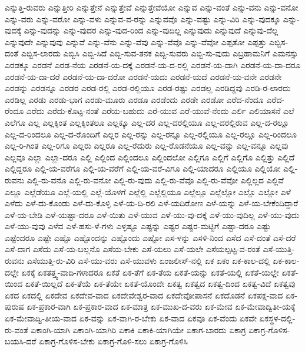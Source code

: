 {ಎನ್ನುತ್ತಿ-ರುವರು
ಎನ್ನುತ್ತೀರಿ
ಎನ್ನುತ್ತೇನೆ
ಎನ್ನುತ್ತೇವೆ
ಎನ್ನುತ್ತೇವೆಯೋ
ಎನ್ನುವ
ಎನ್ನು-ವಂತೆ
ಎನ್ನು-ವನು
ಎನ್ನು-ವನೋ
ಎನ್ನು-ವರು
ಎನ್ನು-ವರೋ
ಎನ್ನು-ವಳು
ಎನ್ನುವ-ವ-ರನ್ನು
ಎನ್ನುವವೊ
ಎನ್ನು-ವಷ್ಟು
ಎನ್ನು-ವಿರಿ
ಎನ್ನು-ವುದಕ್ಕೂ
ಎನ್ನು-ವುದಕ್ಕೆ
ಎನ್ನು-ವುದನ್ನು
ಎನ್ನು-ವುದರ
ಎನ್ನು-ವುದ-ರಿಂದ
ಎನ್ನು-ವುದಿಲ್ಲ
ಎನ್ನುವುದು
ಎನ್ನುವುದೆ
ಎನ್ನುವು-ದೆಲ್ಲ
ಎನ್ನುವುದೇ
ಎನ್ನುವುವು
ಎನ್ನುವೆ
ಎನ್ನು-ವೆನು
ಎನ್ನು-ವೆವು
ಎನ್ನು-ವೆವೊ
ಎನ್ನು-ವೆವೋ
ಎಪ್ಪತೋ
ಎಪ್ಪತ್ತು
ಎಬ್ಬಿಸ-ದಂತೆ
ಎಬ್ಬಿಸ-ಲಾರದು
ಎಬ್ಬಿಸಿ
ಎಬ್ಬಿ-ಸಿದೆ
ಎಬ್ಬಿ-ಸುವ-ತನಕ
ಎಬ್ಬಿ-ಸುವರು
ಎಬ್ಬಿ-ಸು-ವುದು
ಎಬ್ರಹಾಮನಿಗೆ
ಎಮನಸ್ಸು
ಎರಡಕ್ಕೂ
ಎರಡನೆ
ಎರಡ-ನೆಯ
ಎರಡನೆ-ಯ-ದಕ್ಕೆ
ಎರಡನೆ-ಯ-ದ-ರಲ್ಲಿ
ಎರಡನೆ-ಯ-ದಾಗಿ
ಎರಡನೆ-ಯ-ದಾ-ದರೂ
ಎರಡನೆ-ಯ-ದಾ-ದರೆ
ಎರಡನೆ-ಯ-ದಾ-ದರೋ
ಎರಡನೆ-ಯದು
ಎರಡನೆ-ಯದೆ
ಎರಡನೆ-ಯ-ವನೇ
ಎರಡನೇ
ಎರಡನ್ನು
ಎರಡನ್ನೂ
ಎರಡರ
ಎರಡ-ರಲ್ಲಿ
ಎರಡ-ರಲ್ಲಿಯೂ
ಎರಡ-ರಷ್ಟು
ಎರಡಲ್ಲ
ಎರಡಿದ್ದವು
ಎರಡಿ-ರ-ಲಾರದು
ಎರಡಿಲ್ಲ
ಎರಡು
ಎರಡು-ಭಾಗ
ಎರಡು-ಮೂರು
ಎರಡೂ
ಎರಡೆಂದು
ಎರಡೇ
ಎರಡೋ
ಎರೆದ-ನೆಂದೂ
ಎರೆದ-ರೆಂದೂ
ಎರೆದು
ಎರೆದು-ಕೊಟ್ಟ-ನಂತೆ
ಎರೆಯ-ಬಹುದು
ಎರೆ-ಯುವ
ಎರೆ-ಯುವೆ-ನೆಂದು
ಎರ್ಲಿ
ಎಲಿಯಾಸನೆ
ಎಲೆ
ಎಲೆಗೂ
ಎಲ್ಲ
ಎಲ್ಲಕ್ಕಿಂತ
ಎಲ್ಲಕ್ಕಿಂತಲೂ
ಎಲ್ಲಕ್ಕೂ
ಎಲ್ಲ-ದರ
ಎಲ್ಲ-ದರಲ್ಲಿಯೂ
ಎಲ್ಲ-ದರಲ್ಲಿರುವ
ಎಲ್ಲ-ದ-ರಲ್ಲೂ
ಎಲ್ಲ-ದ-ರಿಂದಲೂ
ಎಲ್ಲ-ದ-ರೊಂದಿಗೆ
ಎಲ್ಲರ
ಎಲ್ಲ-ರನ್ನು
ಎಲ್ಲ-ರನ್ನೂ
ಎಲ್ಲ-ರಲ್ಲಿಯೂ
ಎಲ್ಲ-ರಲ್ಲೂ
ಎಲ್ಲ-ರಿಂದಲೂ
ಎಲ್ಲ-ರಿ-ಗಿಂತ
ಎಲ್ಲ-ರಿಗೂ
ಎಲ್ಲರು
ಎಲ್ಲರೂ
ಎಲ್ಲ-ರೆದುರು
ಎಲ್ಲ-ರೊಡನೆಯೂ
ಎಲ್ಲ-ವನ್ನು
ಎಲ್ಲ-ವನ್ನೂ
ಎಲ್ಲವು
ಎಲ್ಲವೂ
ಎಲ್ಲಾ
ಎಲ್ಲಾ-ದರೂ
ಎಲ್ಲಿ
ಎಲ್ಲಿಂದ
ಎಲ್ಲಿಂದಲೂ
ಎಲ್ಲಿಂದಲೋ
ಎಲ್ಲಿಗೂ
ಎಲ್ಲಿಗೆ
ಎಲ್ಲಿಗೊ
ಎಲ್ಲಿತ್ತು
ಎಲ್ಲಿದೆ
ಎಲ್ಲಿದ್ದರೂ
ಎಲ್ಲಿ-ಯ-ವರೆಗೂ
ಎಲ್ಲಿ-ಯ-ವರೆಗೆ
ಎಲ್ಲಿ-ಯ-ವರೆ-ವಿಗೂ
ಎಲ್ಲಿ-ಯಾದರೂ
ಎಲ್ಲಿಯೂ
ಎಲ್ಲಿಯೋ
ಎಲ್ಲಿ-ರುವನು
ಎಲ್ಲಿ-ರು-ವನೊ
ಎಲ್ಲಿ-ರು-ವನೋ
ಎಲ್ಲಿ-ರು-ವುದು
ಎಲ್ಲಿ-ರು-ವೆವೊ
ಎಲ್ಲಿ-ರು-ವೆವೋ
ಎಲ್ಲಿಲ್ಲದ
ಎಲ್ಲಿವೆ
ಎಲ್ಲೂ
ಎಲ್ಲೆಡೆಯೂ
ಎಲ್ಲೆ-ಯಲ್ಲಿ
ಎಲ್ಲೆ-ಯೊಳಗೆ
ಎಲ್ಲೆಲ್ಲಿ
ಎಲ್ಲೆಲ್ಲಿಯೂ
ಎಲ್ಲೆಲ್ಲೂ
ಎಲ್ಲೆಲ್ಲೋ
ಎಲ್ಲೊ
ಎಲ್ಲೋ
ಎಳೆ
ಎಳೆದು
ಎಳೆ-ದು-ಕೊಂಡು
ಎಳೆ-ದು-ಕೊಳ್ಳಿ
ಎಳೆ-ಯ-ದಿ-ರಲಿ
ಎಳೆ-ಯದಿರೋಣ
ಎಳೆ-ಯನ್ನು
ಎಳೆ-ಯ-ಬೇಕೆಂದಿದ್ದಾರೆ
ಎಳೆ-ಯ-ಬೇಡಿ
ಎಳೆ-ಯಷ್ಟಾ-ದರೂ
ಎಳೆ-ಯಿತು
ಎಳೆ-ಯುವ
ಎಳೆ-ಯು-ವು-ದಕ್ಕೆ
ಎಳೆ-ಯು-ವುದಿಲ್ಲ
ಎಳೆ-ಯು-ವುದು
ಎಳೆ-ಯು-ವುವು
ಎಳೆವ
ಎಳೆ-ಹಸು-ಳೆ-ಗಳು
ಎಳ್ಳಷ್ಟೂ
ಎಷ್ಟನ್ನು
ಎಷ್ಟರ
ಎಷ್ಟರ-ಮಟ್ಟಿಗೆ
ಎಷ್ಟಾ-ದರೂ
ಎಷ್ಟು
ಎಷ್ಟೆಂದರೂ
ಎಷ್ಟೇ
ಎಷ್ಟೊ
ಎಷ್ಟೊಂದನ್ನು
ಎಷ್ಟೊಂದು
ಎಷ್ಟೋ
ಎಸ-ಳನ್ನು
ಎಸಳಿ-ನಿಂದ
ಎಸೆದ
ಎಸೆ-ದಂತೆ
ಎಸೆ-ದರೆ
ಎಸೆ-ದಾಗ
ಎಸೆದು
ಎಸೆ-ಯ-ಬಲ್ಲನೊ
ಎಸೆಯ-ಬೇಕು
ಎಸೆ-ಯಲು
ಎಸೆ-ಯಲೇ
ಎಸೆಯಲ್ಪಟ್ಟ-ವ-ರಂತೆ
ಎಸೆ-ಯುತ್ತಿ-ರುವನು
ಎಸೆಯುತ್ತಿ-ರು-ವಿರಿ
ಎಸೆ-ಯು-ವರು
ಎಸೆ-ಯುವಳು
ಏಂಜಲೀಸ್-ನಲ್ಲಿ
ಏಕ
ಏಕಂ
ಏಕ-ಕಾಲ-ದಲ್ಲಿ
ಏಕ-ಕಾಲ-ದಲ್ಲೇ
ಏಕಕ್ಕೆ
ಏಕತತ್ತ್ವ-ವಾದಿ-ಗಳಾದರೂ
ಏಕತೆ
ಏಕ-ತೆಗೆ
ಏಕ-ತೆಯ
ಏಕತೆ-ಯನ್ನು
ಏಕತೆ-ಯಲ್ಲಿ
ಏಕತೆ-ಯಲ್ಲೇ
ಏಕತೆ-ಯಿಂದ
ಏಕತೆ-ಯಿಲ್ಲದೆ
ಏಕ-ತೆಯೆ
ಏಕ-ತೆಯೇ
ಏಕತೆ-ಯೊಂದೇ
ಏಕತ್ವ
ಏಕತ್ವದ
ಏಕತ್ವ-ದಿಂದ
ಏಕತ್ವ-ವಿದೆ
ಏಕತ್ವವು
ಏಕದ
ಏಕದಲ್ಲಿ
ಏಕದೇವ
ಏಕದೇವ-ವಾದ
ಏಕದೇವೇಶ್ವರ-ವಾದ
ಏಕದೇವೋಪಾಸನೆ
ಏಕದೊಡನೆ
ಏಕಪಕ್ಷ-ವಾದ
ಏಕ-ಪುರುಷ
ಏಕ-ಪ್ರಕಾರ-ವಾಗಿ
ಏಕ-ಪ್ರಕಾರ-ವಾದ
ಏಕ-ಮಾತ್ರ
ಏಕ-ಮುಖ-ದ-ವರು
ಏಕ-ಮೇವ
ಏಕ-ಮೇವಾದ್ವಿತೀ-ಯಕ್ಕೆ
ಏಕ-ಮೇವಾದ್ವಿ-ತೀಯ-ವಾದ
ಏಕ-ವನ್ನು
ಏಕ-ವಾಗಿ-ರ-ಬೇಕು
ಏಕ-ವಾದ
ಏಕವೂ
ಏಕ-ವೆಂದು
ಏಕವೇ
ಏಕಸ್ಥಳ-ದಲ್ಲಿ-ರು-ವಂತೆ
ಏಕಾಂಗಿ-ಯಾಗಿ
ಏಕಾಂಗಿ-ಯಾಗಿರಿ
ಏಕಾಕಿ
ಏಕಾಕಿ-ಯಾಗಿಯೇ
ಏಕಾಗ-ಬಾರದು
ಏಕಾಗ್ರ
ಏಕಾಗ್ರ-ಗೊಳಿಸ-ಬಯಸಿ-ದರೆ
ಏಕಾಗ್ರ-ಗೊಳಿಸ-ಬೇಕು
ಏಕಾಗ್ರ-ಗೊಳಿ-ಸಲು
ಏಕಾಗ್ರ-ಗೊಳಿಸಿ
}
